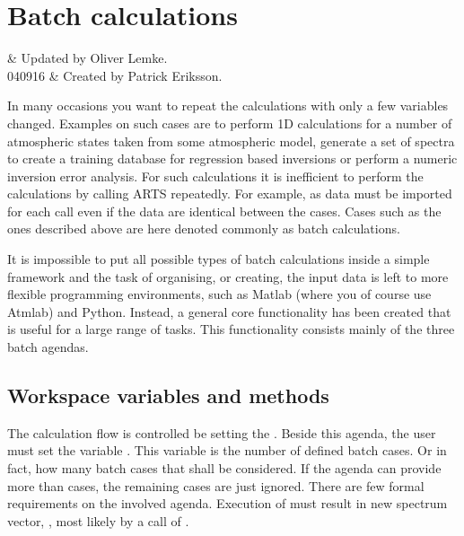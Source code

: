 \chapter{Batch calculations}
 \label{sec:batch}


%
%
 & Updated by Oliver Lemke.\\
  040916 & Created by Patrick Eriksson.\\
\stophistory

In many occasions you want to repeat the calculations with only a few
variables changed. Examples on such cases are to perform 1D
calculations for a number of atmospheric states taken from some
atmospheric model, generate a set of spectra to create a training
database for regression based inversions or perform a numeric
inversion error analysis. For such calculations it is inefficient to
perform the calculations by calling ARTS repeatedly. For example, as
data must be imported for each call even if the data are identical
between the cases. Cases such as the ones described above are here
denoted commonly as batch calculations.

It is impossible to put all possible types of batch calculations
inside a simple framework and the task of organising, or creating, the
input data is left to more flexible programming environments, such as
Matlab (where you of course use Atmlab) and Python. Instead, a general
core functionality has been created that is useful for a large range
of tasks. This functionality consists mainly of the three batch
agendas.


\section{Workspace variables and methods}
%
The calculation flow is controlled be setting the
.
Beside this agenda, the user must set the variable
. This variable is the number of defined batch
cases. Or in fact, how many batch cases that shall be considered. If
the agenda can provide more than  cases, the
remaining cases are just ignored. There are few formal requirements on
the involved agenda. Execution of 
must result in new spectrum vector, , most likely by a
call of .

